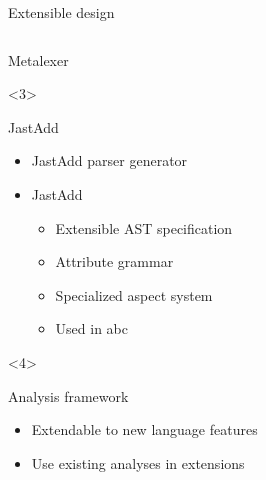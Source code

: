 \begin{frame}[t]{Extensible design}
\begin{columns}[T]
\begin{column}{5cm}
\begin{onlyenv}
\begin{block}{Metalexer
          \vspace{1ex}}
        \end{block}
      \end{onlyenv}
      \begin{onlyenv}<3>
        \begin{block}{JastAdd}
          \begin{itemize}
          \item JastAdd parser generator
          \item JastAdd 
            \begin{itemize}
            \item Extensible AST specification
            \item Attribute grammar
            \item Specialized aspect system
            \item Used in abc
            \end{itemize}
          \end{itemize}
        \end{block}
      \end{onlyenv}
      \begin{onlyenv}<4>
        \begin{block}{Analysis framework}
          \begin{itemize}
          \item Extendable to new language features
          \item Use existing analyses in extensions
          \end{itemize}
        \end{block}
      \end{onlyenv}
    \end{column}
  \end{columns}
\end{frame}

